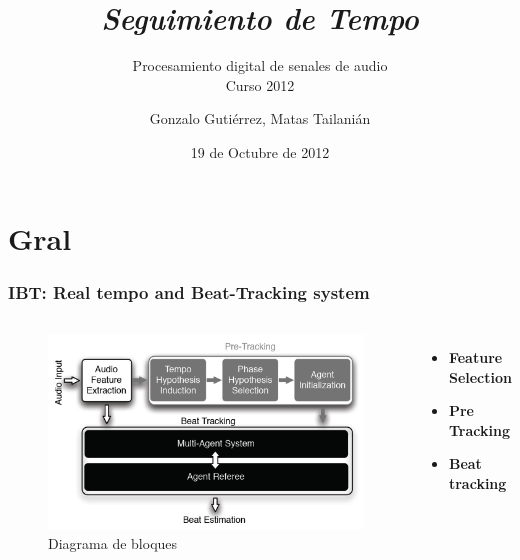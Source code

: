 \documentclass[slidestop,compress,mathserif,xcolor=svgnames,table]{beamer}
\author{Gonzalo Gutiérrez, Matas Tailanián}
\date{19 de Octubre de 2012}
\title{\textit{Seguimiento de Tempo}}
\subtitle{Procesamiento digital de senales de audio\\Curso 2012}
\newenvironment{itemize*}%
  {\begin{itemize}%
    \setlength{\topsep}{10pt}%
    \setlength{\itemsep}{0pt}%
    \setlength{\parskip}{10pt}}%
  {\end{itemize}
}
\begin{document}
\begin{frame}
  \titlepage
\end{frame}


\section{Gral}
\begin{frame}
\frametitle{IBT: Real tempo and Beat-Tracking system}

\begin{columns}

\column{2in}
\vspace{15pt}
\begin{figure}[h!]
  \begin{center}
  \includegraphics[width=1\textwidth]{./pics/bloques.png}
  \end{center}
  \vspace{-10pt}
  \caption{Diagrama de bloques}
  \label{fig:bloques}
\end{figure}

\column{2in}
\vspace{20pt}
\begin{itemize}
	\item \textbf{Feature Selection}\pause
	\item \textbf{Pre Tracking}\\\pause
	\item \textbf{Beat tracking}
\end{itemize}

\end{columns}
\end{frame}
\end{document}
